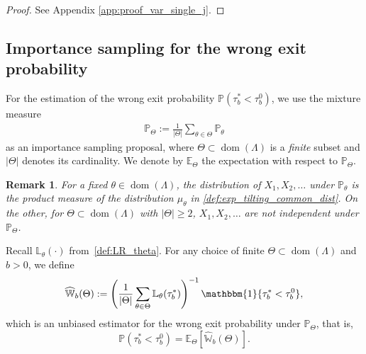 \documentclass[aap,preprint]{imsart}
\newcommand{\Pro}{{\mathbb{P}}}
\newcommand{\Exp}{{\mathbb{E}}}
\theoremstyle{plain}
\newtheorem{remark}{Remark}[section]
\theoremstyle{definition}
\begin{document}
\begin{proof}
    See Appendix \ref{app:proof_var_single_j}.
\end{proof}



\subsection{Importance sampling for the   wrong exit probability}\label{sec:IS_general}
For the estimation of the wrong exit probability $\Pro\left(\tau_b^* < \tau_b^0\right)$, we use the mixture measure
\begin{align*}
    \Pro_{\Theta} := \frac{1}{|\Theta|} \sum_{\theta \in \Theta} \Pro_{\theta}
\end{align*}
as an importance sampling proposal, where $\Theta \subset \operatorname{dom}(\Lambda)$ is a \emph{finite} subset and $|\Theta|$ denotes its cardinality. We denote by $\Exp_{\Theta}$ the expectation with respect to $\Pro_{\Theta}$.



\begin{remark}
For a fixed $\theta \in \operatorname{dom}(\Lambda)$, the distribution of $X_1,X_2,\ldots$ 
under $\Pro_{\theta}$ is the product measure of the distribution $\mu_{\theta}$ in \eqref{def:exp_tilting_common_dist}. On the other, for $\Theta \subset \operatorname{dom}(\Lambda)$ with $|\Theta| \geq 2$, $X_1, X_2,\ldots$ are not independent  under $\Pro_{\Theta}$.
\end{remark}

  
Recall $\mathbb{L}_{\theta}(\cdot)$ from~\eqref{def:LR_theta}.
For any choice of finite $\Theta \subset \operatorname{dom}(\Lambda)$ and $b>0$,  we define
\begin{align}
    \label{def:unbiased_estimator_Theta}
\widehat{\mathbb{W}}_{b}(\Theta)  :=  
   \left( \frac{1}{|\Theta|} \sum_{\theta \in \Theta} 
\mathbb{L}_{\theta}(\tau_b^*) \right)^{-1} \mathbbm{1}\{\tau_b^* < \tau_b^0\},
\end{align}
which is  an  unbiased estimator  for the wrong exit probability under $\Pro_\Theta$, that is,
$$
\Pro\left(\tau_b^* < \tau_b^0\right)= \Exp_{\Theta} \left[   \widehat{\mathbb{W}}_{b}(\Theta) \right].
$$
\end{document}
